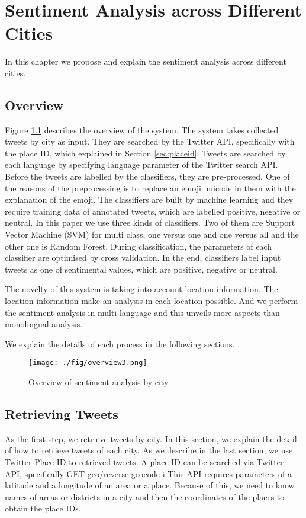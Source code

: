 \chapter{Sentiment Analysis across Different Cities}
In this chapter we propose and explain the sentiment analysis across different cities.
\section{Overview}\label{sec:overview}
Figure \ref{fig:overview} describes the overview of the system.
The system takes collected tweets by city as input.
They are searched by the Twitter API, specifically with the place ID, which explained in Section \ref{sec:placeid}.
Tweets are searched by each language by specifying language parameter of the Twitter search API.
Before the tweets are labelled by the classifiers, they are pre-processed.
One of the reasons of the preprocessing is to replace an emoji unicode in them with the explanation of the emoji.
The classifiers are built by machine learning and they require training data of annotated tweets, which are labelled positive, negative or neutral.
In this paper we use three kinds of classifiers.
Two of them are Support Vector Machine (SVM) for multi class, one versus one and one versus all and the other one is Random Forest.
During classification, the parameters of each classifier are optimised by cross validation.
In the end, classifiers label input tweets as one of sentimental values, which are positive, negative or neutral.

The novelty of this system is taking into account location information.
The location information make an analysis in each location possible.
And we perform the sentiment analysis in multi-language and this unveils more aspects than monolingual analysis.

We explain the details of each process in the following sections.
\begin{figure}
	\centering
	\texttt{[image: ./fig/overview3.png]}
	\caption{Overview of sentiment analysis by city}
	\label{fig:overview}
\end{figure}

\section{Retrieving Tweets}\label{sec:retrieving}
As the first step, we retrieve tweets by city.
In this section, we explain the detail of how to retrieve tweets of each city.
As we describe in the last section, we use Twitter Place ID to retrieved tweets.
A place ID can be searched via Twitter API, specifically GET geo/reverse geocode 
i%
This API requires parameters of a latitude and a longitude of an area or a place.
Because of this, we need to know names of areas or districts in a city and then the coordinates of the places to obtain the place IDs.

